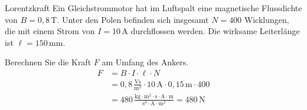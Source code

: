 \begin{frame} 
	\begin{bsp}{Lorentzkraft}{}
		Ein Gleichstrommotor hat im Luftspalt eine magnetische Flussdichte von $B=0,8\,\mathrm{T}$. Unter den Polen befinden sich insgesamt $N=400$ Wicklungen, die mit einem Strom von $I=10\,\mathrm{A}$ durchflossen werden. Die wirksame Leiterlänge ist $\ell=150\,\mathrm{mm}$.

		Berechnen Sie die Kraft $F$ am Umfang des Ankers.\pause
		\begin{align*}
			F & =B\cdot I\cdot \ell\cdot N                                                                                                               \\
			  & =0,8\,\tfrac{\mathrm{Vs}}{\mathrm{m}^2}\cdot 10\,\mathrm{A}\cdot0,15\,\mathrm{m}\cdot 400                                                        \\
			  & =480\,\frac{\mathrm{kg}\cdot\mathrm{m}^2\cdot\mathrm{s}\cdot\mathrm{A}\cdot\mathrm{m}}{\mathrm{s}^3\cdot\mathrm{A}\cdot\mathrm{m}^2}     = 480\,\mathrm{N}
		\end{align*}

	\end{bsp}
\end{frame}

